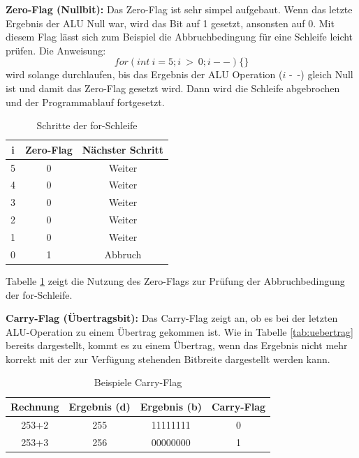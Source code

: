 \documentclass[a4paper,12pt]{article}
\begin{document}
\par\smallskip\noindent \textbf{Zero-Flag (Nullbit):} Das Zero-Flag ist sehr simpel aufgebaut. Wenn das letzte Ergebnis der ALU Null war, wird das Bit auf 1 gesetzt, ansonsten auf 0. Mit diesem Flag lässt sich zum Beispiel die Abbruchbedingung für eine Schleife leicht prüfen. Die Anweisung: $$for(int \ i=5;i \ > \ 0;i--)\{\}$$ wird solange durchlaufen, bis das Ergebnis der ALU Operation ($i$ -\ -) gleich Null ist und damit das Zero-Flag gesetzt wird. Dann wird die Schleife abgebrochen und der Programmablauf fortgesetzt. \cite[S.95]{mikroprozessortechnik2011}
\begin{table}[!htb]
\centering
\begin{tabular}{|c|c|c|}
\hline

i & Zero-Flag & Nächster Schritt \\ \hline
5 & 0         & Weiter           \\ \hline
4 & 0         & Weiter           \\ \hline
3 & 0         & Weiter           \\ \hline
2 & 0         & Weiter           \\ \hline
1 & 0         & Weiter           \\ \hline
0 & 1         & Abbruch          \\ \hline
\end{tabular}
\caption{Schritte der for-Schleife}
\label{forschleife}
\end{table}

\noindent Tabelle \ref{forschleife} zeigt die Nutzung des Zero-Flags zur Prüfung der Abbruchbedingung der for-Schleife. 

\par\bigskip\noindent \textbf{Carry-Flag (Übertragsbit):} Das Carry-Flag zeigt an, ob es bei der letzten ALU-Operation zu einem Übertrag gekommen ist. Wie in Tabelle \ref{tab:uebertrag} bereits dargestellt, kommt es zu einem Übertrag, wenn das Ergebnis nicht mehr korrekt mit der zur Verfügung stehenden Bitbreite dargestellt werden kann.\cite[S.95]{mikroprozessortechnik2011}


\begin{table}[!htb]
\centering
\begin{tabular}{|c|c|c|c|}
\hline
Rechnung & Ergebnis (d) & Ergebnis (b) & Carry-Flag \\ \hline \hline
253+2    & 255          & 11111111     & 0          \\ \hline \hline
253+3    & 256          & 00000000     & 1          \\ \hline
\end{tabular}
\caption{Beispiele Carry-Flag}
\label{tab:carry}

\end{table}
\end{document}
